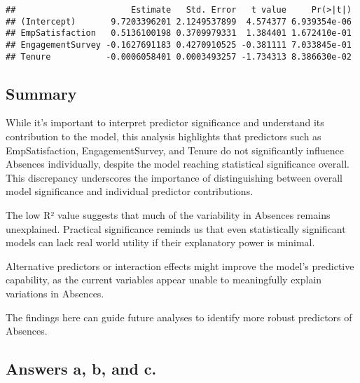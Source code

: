 \documentclass[
]{article}
\newenvironment{Shaded}{\begin{snugshade}}{\end{snugshade}}
\newcommand{\CommentTok}[1]{\textcolor[rgb]{0.56,0.35,0.01}{\textit{#1}}}
\newcommand{\DecValTok}[1]{\textcolor[rgb]{0.00,0.00,0.81}{#1}}
\newcommand{\NormalTok}[1]{#1}
\newcommand{\OtherTok}[1]{\textcolor[rgb]{0.56,0.35,0.01}{#1}}
\newcommand{\SpecialCharTok}[1]{\textcolor[rgb]{0.81,0.36,0.00}{\textbf{#1}}}
\begin{document}
\begin{verbatim}
##                       Estimate   Std. Error   t value     Pr(>|t|)
## (Intercept)       9.7203396201 2.1249537899  4.574377 6.939354e-06
## EmpSatisfaction   0.5136100198 0.3709979331  1.384401 1.672410e-01
## EngagementSurvey -0.1627691183 0.4270910525 -0.381111 7.033845e-01
## Tenure           -0.0006058401 0.0003493257 -1.734313 8.386630e-02
\end{verbatim}

\begin{Shaded}
\end{Shaded}

\subsection{Summary}\label{summary-2}

While it's important to interpret predictor significance and understand
its contribution to the model, this analysis highlights that predictors
such as EmpSatisfaction, EngagementSurvey, and Tenure do not
significantly influence Absences individually, despite the model
reaching statistical significance overall. This discrepancy underscores
the importance of distinguishing between overall model significance and
individual predictor contributions.

The low R² value suggests that much of the variability in Absences
remains unexplained. Practical significance reminds us that even
statistically significant models can lack real world utility if their
explanatory power is minimal.

Alternative predictors or interaction effects might improve the model's
predictive capability, as the current variables appear unable to
meaningfully explain variations in Absences.

The findings here can guide future analyses to identify more robust
predictors of Absences.

\subsection{Answers a, b, and c.}\label{answers-a-b-and-c.-2}
\end{document}
